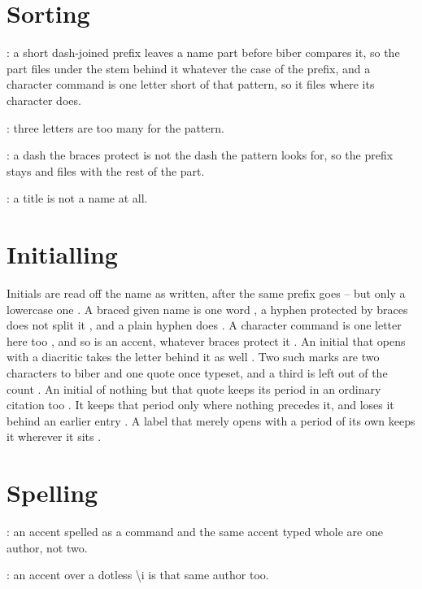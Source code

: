 \documentclass[acmsmall,nonacm,natbib=false]{acmart}
\begin{document}
\thispagestyle{empty}

\section*{Sorting}
\cite{NsAbe,NsAeZed,NsDeZed,NsAlHakim,NsFox}: a short dash-joined prefix leaves a name part before biber compares it, so the part files under the stem behind it whatever the case of the prefix, and a character command is one letter short of that pattern, so it files where its character does.

\cite{NsIbnSina}: three letters are too many for the pattern.

\cite{NsAbe,NsProt,NsFox}: a dash the braces protect is not the dash the pattern looks for, so the prefix stays and files with the rest of the part.

\cite{NsTitle}: a title is not a name at all.

\section*{Initialling}
Initials are read off the name as written, after the same prefix goes -- but only a lowercase one \citeauthor{NiNoinit} \citeauthor{NiQuirk} \citeauthor{NiUpper} \citeauthor{NiRho}.
A braced given name is one word \citeauthor{NiBraced} \citeauthor{NiSage}, a hyphen protected by braces does not split it \citeauthor{NiProtect} \citeauthor{NiTell}, and a plain hyphen does \citeauthor{NiHyphen} \citeauthor{NiVane}.
A character command is one letter here too \citeauthor{NiChar} \citeauthor{NiZeta}, and so is an accent, whatever braces protect it \citeauthor{NiAccent} \citeauthor{NiYew}.
An initial that opens with a diacritic takes the letter behind it as well \citeauthor{NiAli} \citeauthor{NiWard}.
Two such marks are two characters to biber and one quote once typeset, and a third is left out of the count \citeauthor{NiAliTwo} \citeauthor{NiXuThree} \citeauthor{NiXu}.
An initial of nothing but that quote keeps its period in an ordinary citation too \cite{NiAliTwo,NiAli,NiWard}.
It keeps that period only where nothing precedes it, and loses it behind an earlier entry \cite{NsAbe,NiAliTwo}.
A label that merely opens with a period of its own keeps it wherever it sits \cite{NzBang,NzDotNet}.

\section*{Spelling}
\cite{NzEsc,NzLit}: an accent spelled as a command and the same accent typed whole are one author, not two.

\cite{NzDotless,NzDotted}: an accent over a dotless \textbackslash{}i is that same author too.

\printbibliography
\end{document}
